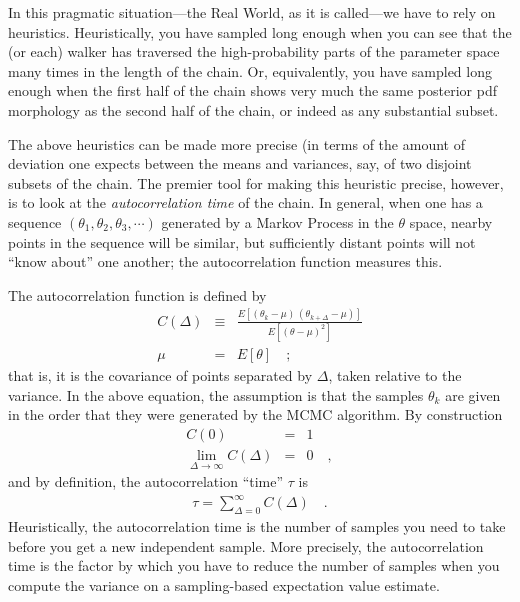 \documentclass[12pt,twoside,pdftex]{article}
\newcommand{\pars}{\theta}
\begin{document}
In this pragmatic situation---the Real World, as it is called---we have to rely on heuristics.
Heuristically, you have sampled long enough when you can see
that the (or each) walker has traversed the high-probability parts of
the parameter space many times in the length of the chain.
Or, equivalently, you have sampled long enough when the first half of
the chain shows very much the same posterior pdf morphology as the
second half of the chain, or indeed as any substantial subset.

The above heuristics can be made more precise (in terms of the amount
of deviation one expects between the means and variances, say, of two
disjoint subsets of the chain.
The premier tool for making this heuristic precise, however, is to
look at the \emph{autocorrelation time} of the chain.
In general, when one has a sequence $(\pars_1, \pars_2, \theta_3, \cdots)$
generated by a Markov Process in the $\pars$ space, nearby points in
the sequence will be similar, but sufficiently distant points will not
``know about'' one another;
the autocorrelation function measures this.

The autocorrelation function is defined by
\begin{eqnarray}
C(\Delta) &\equiv& \frac{E[(\pars_k - \mu)\,(\pars_{k+\Delta} - \mu)]}{E[(\pars - \mu)^2]}
\label{eq:autocorrelationfn}\\
\mu &=& E[\pars]
\quad ;
\end{eqnarray}
that is, it is the covariance of points separated by $\Delta$, taken
relative to the variance.
In the above equation, the assumption is that the samples $\pars_k$ are
given in the order that they were generated by the MCMC algorithm.
By construction
\begin{eqnarray}
C(0) &=& 1
\\
\lim_{\Delta\rightarrow\infty} C(\Delta) &=& 0
\quad ,
\end{eqnarray}
and by definition, the autocorrelation ``time'' $\tau$ is
\begin{eqnarray}
\tau = \sum_{\Delta = 0}^{\infty} C(\Delta)
\label{eq:autocorrelationtime}\quad .
\end{eqnarray}
Heuristically, the autocorrelation time is the number of samples you
need to take before you get a new independent sample.
More precisely, the autocorrelation time is the factor by which you
have to reduce the number of samples when you compute the variance on
a sampling-based expectation value estimate.
\end{document}
